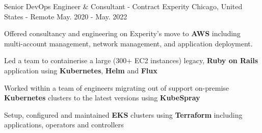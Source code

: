 
\begin{cventries}


  \cventry
    {Senior DevOps Engineer \& Consultant - Contract} %
    {Experity} %
    {Chicago, United States - Remote} %
    {May. 2020 - May. 2022} %
    {
      \begin{cvitems} %
        \item {Offered consultancy and engineering on Experity's move to \textbf{AWS} including multi-account management, network management, and application deployment.}
        \item {Led a team to containerise a large (300+ EC2 instances) legacy, \textbf{Ruby on Rails} application using \textbf{Kubernetes}, \textbf{Helm} and \textbf{Flux}}
        \item {Worked within a team of engineers migrating out of support on-premise \textbf{Kubernetes} clusters to the latest versions using \textbf{KubeSpray}}
        \item {Setup, configured and maintained \textbf{EKS} clusters using \textbf{Terraform} including applications, operators and controllers}
      \end{cvitems}
    }


\end{cventries}

